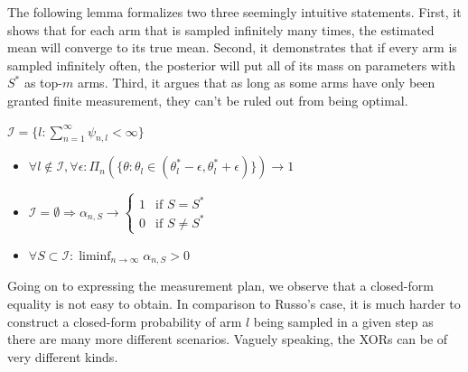 The following lemma formalizes two three seemingly intuitive statements. First,
it shows that for each arm that is sampled infinitely many times, the estimated
mean will converge to its true mean. Second, it demonstrates that if every arm
is sampled infinitely often, the posterior will put all of its mass on
parameters with $S^*$ as top-$m$ arms. Third, it argues that as long as some
arms have only been granted finite measurement, they can't be ruled out from
being optimal.
\begin{lemma}\label{lemma:finite_measurement}
  $\mathcal{I} = \{l: \sum_{n=1}^\infty \psi_{n, l} < \infty\}$
  \begin{itemize}
    \item $\forall l \notin \mathcal{I}, \forall \epsilon: \Pi_n(\{\theta:
        \theta_l \in (\theta^*_l - \epsilon, \theta^*_l + \epsilon)\})
        \rightarrow 1$
    \item $\mathcal{I} = \emptyset \Rightarrow
    \alpha_{n, S} \rightarrow \begin{cases}
      1 & \text{if } S = S^*\\
      0 & \text{if } S \neq S^*
    \end{cases}$
    \item $\forall S \subset \mathcal{I}: \liminf_{n \rightarrow \infty}
        \alpha_{n, S} > 0$
  \end{itemize}
\end{lemma}
Going on to expressing the measurement plan, we observe that a closed-form
equality is not easy to obtain. In comparison to Russo's case, it is much harder
to construct a closed-form probability of arm $l$ being sampled in a given step
as there are many more different scenarios. Vaguely speaking, the XORs can be of
very different kinds.

